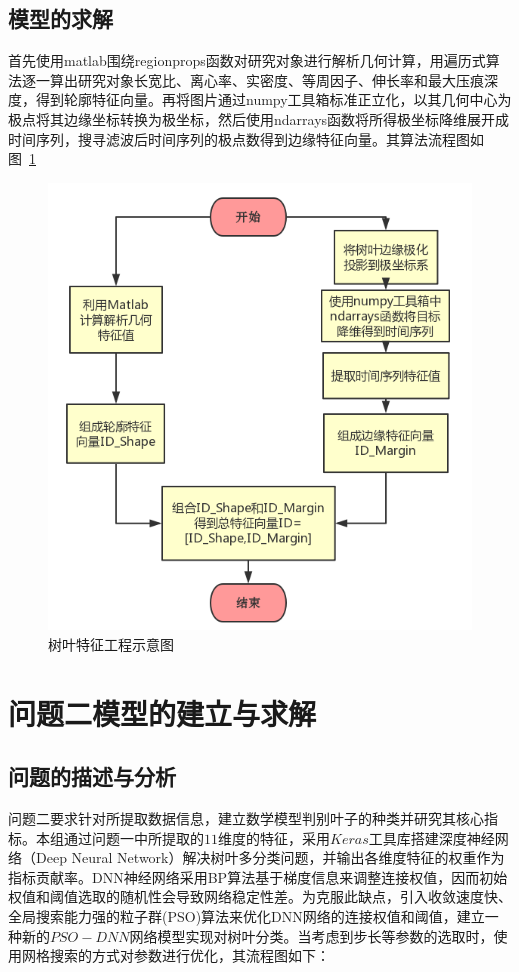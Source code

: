 \documentclass{whutmod}
\begin{document}
	      \subsection{模型的求解}
	      首先使用matlab围绕regionprops函数对研究对象进行解析几何计算，用遍历式算法逐一算出研究对象长宽比、离心率、实密度、等周因子、伸长率和最大压痕深度，得到轮廓特征向量。再将图片通过numpy工具箱标准正立化，以其几何中心为极点将其边缘坐标转换为极坐标，然后使用ndarrays函数将所得极坐标降维展开成时间序列，搜寻滤波后时间序列的极点数得到边缘特征向量。其算法流程图如图~\ref{88}~
	      
	      \begin{figure}[H]
	      	\centering
	      	\includegraphics[width=.8\textwidth]{figures/lct.png}
	      	\caption{树叶特征工程示意图}\label{88}
	      \end{figure}
	      	
	
	
	
	
	\section{问题二模型的建立与求解}
	\subsection{问题的描述与分析}
	问题二要求针对所提取数据信息，建立数学模型判别叶子的种类并研究其核心指标。本组通过问题一中所提取的$11$维度的特征，采用$Keras$工具库搭建深度神经网络（Deep Neural Network）解决树叶多分类问题，并输出各维度特征的权重作为指标贡献率。DNN神经网络采用BP算法基于梯度信息来调整连接权值，因而初始权值和阈值选取的随机性会导致网络稳定性差。为克服此缺点，引入收敛速度快、全局搜索能力强的粒子群(PSO)算法来优化DNN网络的连接权值和阈值，建立一种新的$PSO-DNN$网络模型实现对树叶分类。当考虑到步长等参数的选取时，使用网格搜索的方式对参数进行优化，其流程图如下：
		
\end{document}
